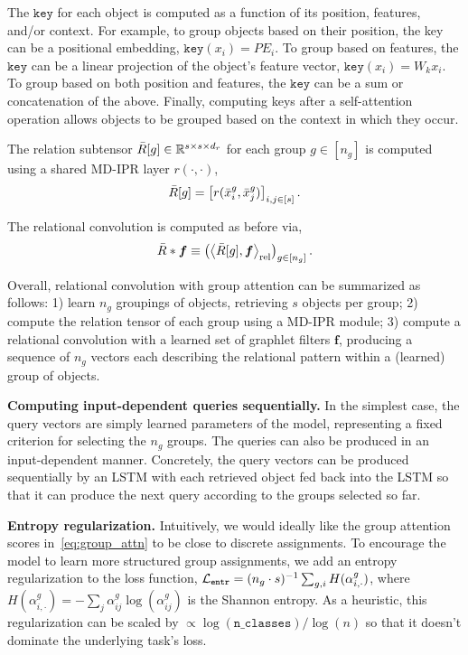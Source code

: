The $\mathtt{key}$ for each object is computed as a function of its position, features, and/or context. For example, to group objects based on their position, the key can be a positional embedding, $\mathtt{key}(x_i) = PE_i$. To group based on features, the $\mathtt{key}$ can be a linear projection of the object's feature vector, $\mathtt{key}(x_i) = W_k x_i$. To group based on both position and features, the $\mathtt{key}$ can be a sum or concatenation of the above. Finally, computing keys after a self-attention operation allows objects to be grouped based on the context in which they occur.

The relation subtensor $\bar{R}[g] \in \mathbb{R}^{s \times s \times d_r}$ for each group $g \in [n_g]$ is computed using a shared MD-IPR layer $r(\cdot, \cdot)$,
\begin{equation}\label{eq:group_attn_relsubtensor}
    \bar{R}[g] = \left[r(\bar{x}_{i}^{g}, \bar{x}_{j}^{g})\right]_{i,j \in [s]}.
\end{equation}

The relational convolution is computed as before via,
\begin{equation}\label{eq:relconv_groupattn}
    \bar{R} \ast \bm{f} \equiv \left(\left\langle \bar{R}[g], \bm{f} \right\rangle_\mathrm{rel}\right)_{g \in [n_g]}.
\end{equation}

Overall, relational convolution with group attention can be summarized as follows: 1) learn $n_g$ groupings of objects, retrieving $s$ objects per group; 2) compute the relation tensor of each group using a MD-IPR module; 3) compute a relational convolution with a learned set of graphlet filters $\bm{f}$, producing a sequence of $n_g$ vectors each describing the relational pattern within a (learned) group of objects.

\textbf{Computing input-dependent queries sequentially.} In the simplest case, the query vectors are simply learned parameters of the model, representing a fixed criterion for selecting the $n_g$ groups. The queries can also be produced in an input-dependent manner. Concretely, the query vectors can be produced sequentially by an LSTM with each retrieved object fed back into the LSTM so that it can produce the next query according to the groups selected so far.

\textbf{Entropy regularization.} Intuitively, we would ideally like the group attention scores in~\cref{eq:group_attn} to be close to discrete assignments. 
To encourage the model to learn more structured group assignments, we add an entropy regularization to the loss function, ${\mathcal{L}}_{\mathtt{entr}} = (n_g \cdot s)^{-1} \sum_{g, i} H(\alpha_{i,\cdot}^{g})$, where $H(\alpha_{i,\cdot}^{g}) = - \sum_{j} \alpha_{ij}^{g} \log(\alpha_{ij}^g)$ is the Shannon entropy. As a heuristic, this regularization can be scaled by $\propto \log(\mathtt{n\_classes}) / \log(n)$ so that it doesn't dominate the underlying task's loss.

